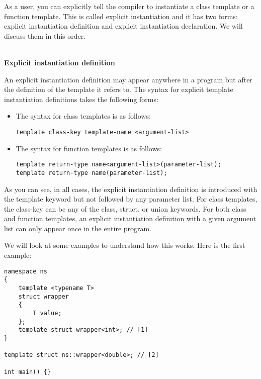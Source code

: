 
As a user, you can explicitly tell the compiler to instantiate a class template or a function template. This is called explicit instantiation and it has two forms: explicit instantiation definition and explicit instantiation declaration. We will discuss them in this order.


\hspace*{\fill} \\ %
\noindent\textbf{Explicit instantiation definition}

An explicit instantiation definition may appear anywhere in a program but after the definition of the template it refers to. The syntax for explicit template instantiation definitions takes the following forms:

\begin{itemize}
\item 
The syntax for class templates is as follows:
\begin{lstlisting}[style=styleCXX]
template class-key template-name <argument-list>
\end{lstlisting}

\item 
The syntax for function templates is as follows:
\begin{lstlisting}[style=styleCXX]
template return-type name<argument-list>(parameter-list);
template return-type name(parameter-list);
\end{lstlisting}
\end{itemize}

As you can see, in all cases, the explicit instantiation definition is introduced with the template keyword but not followed by any parameter list. For class templates, the class-key can be any of the class, struct, or union keywords. For both class and function templates, an explicit instantiation definition with a given argument list can only appear once in the entire program.

We will look at some examples to understand how this works. Here is the first example:

\begin{lstlisting}[style=styleCXX]
namespace ns
{
	template <typename T>
	struct wrapper
	{
		T value;
	};
	template struct wrapper<int>; // [1]
}

template struct ns::wrapper<double>; // [2]

int main() {}
\end{lstlisting}

